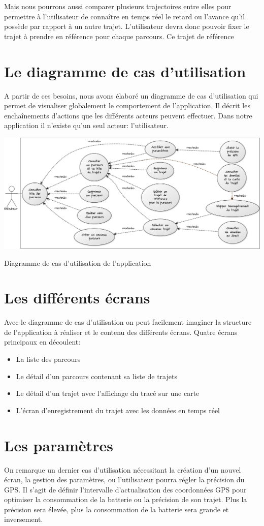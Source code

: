 Mais nous pourrons aussi comparer plusieurs trajectoires entre elles pour permettre à l'utilisateur de connaître en temps réel le retard ou l'avance qu'il possède par rapport à un autre trajet. L'utilisateur devra donc pouvoir fixer le trajet à prendre en référence pour chaque parcours. Ce trajet de référence

\section{Le diagramme de cas d'utilisation}
A partir de ces besoins, nous avons élaboré un diagramme de cas d'utilisation qui permet de visualiser globalement le comportement de l'application. Il décrit les enchaînements d'actions que les différents acteurs peuvent effectuer. Dans notre application il n'existe qu'un seul acteur: l'utilisateur.

\begin{img}
  \includegraphics[scale=0.35]{img/DUC.png}
  \caption{Diagramme de cas d'utilisation de l'application}
\end{img}

\section{Les différents écrans}
Avec le diagramme de cas d'utilisation on peut facilement imaginer la structure de l'application à réaliser et le contenu des différents écrans. Quatre écrans principaux en découlent:\bigskip

\begin{itemize}
  \item La liste des parcours
  \item Le détail d'un parcours contenant sa liste de trajets
  \item Le détail d'un trajet avec l'affichage du tracé sur une carte
  \item L'écran d'enregistrement du trajet avec les données en temps réel 
\end{itemize}\bigskip

\section{Les paramètres}
On remarque un dernier cas d'utilisation nécessitant la création d'un nouvel écran, la gestion des paramètres, ou l'utilisateur pourra régler la précision du GPS. Il s'agit de définir l'intervalle d'actualisation des coordonnées GPS pour optimiser la consommation de la batterie ou la précision de son trajet. Plus la précision sera élevée, plus la consommation de la batterie sera grande et inversement.
 